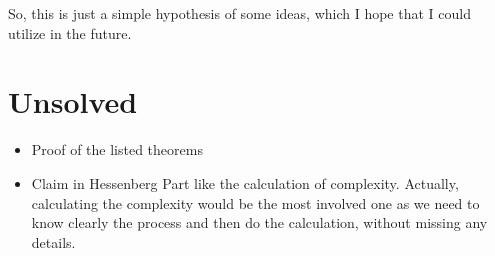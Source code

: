 So, this is just a simple hypothesis of some ideas, which I hope that I could utilize in the future.

\section{Unsolved}
\begin{itemize}
    \item Proof of the listed theorems
    \item Claim in Hessenberg Part like the calculation of complexity. Actually, calculating the complexity would be the most involved one as we need to know clearly the process and then do the calculation, without missing any details. 
\end{itemize}